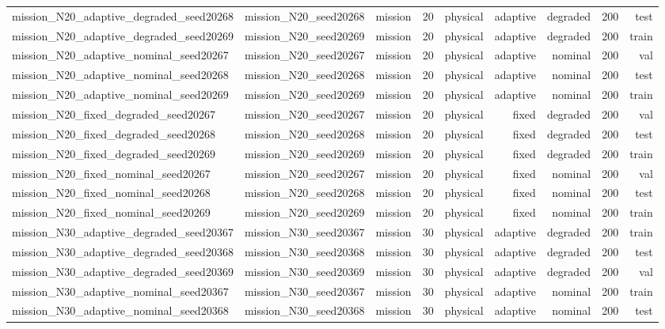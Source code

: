 \begin{tabular}{lrrrrrrrr}
mission\_N20\_adaptive\_degraded\_seed20268 & mission\_N20\_seed20268 & mission & 20 & physical & adaptive & degraded & 200 & test \\
mission\_N20\_adaptive\_degraded\_seed20269 & mission\_N20\_seed20269 & mission & 20 & physical & adaptive & degraded & 200 & train \\
mission\_N20\_adaptive\_nominal\_seed20267 & mission\_N20\_seed20267 & mission & 20 & physical & adaptive & nominal & 200 & val \\
mission\_N20\_adaptive\_nominal\_seed20268 & mission\_N20\_seed20268 & mission & 20 & physical & adaptive & nominal & 200 & test \\
mission\_N20\_adaptive\_nominal\_seed20269 & mission\_N20\_seed20269 & mission & 20 & physical & adaptive & nominal & 200 & train \\
mission\_N20\_fixed\_degraded\_seed20267 & mission\_N20\_seed20267 & mission & 20 & physical & fixed & degraded & 200 & val \\
mission\_N20\_fixed\_degraded\_seed20268 & mission\_N20\_seed20268 & mission & 20 & physical & fixed & degraded & 200 & test \\
mission\_N20\_fixed\_degraded\_seed20269 & mission\_N20\_seed20269 & mission & 20 & physical & fixed & degraded & 200 & train \\
mission\_N20\_fixed\_nominal\_seed20267 & mission\_N20\_seed20267 & mission & 20 & physical & fixed & nominal & 200 & val \\
mission\_N20\_fixed\_nominal\_seed20268 & mission\_N20\_seed20268 & mission & 20 & physical & fixed & nominal & 200 & test \\
mission\_N20\_fixed\_nominal\_seed20269 & mission\_N20\_seed20269 & mission & 20 & physical & fixed & nominal & 200 & train \\
mission\_N30\_adaptive\_degraded\_seed20367 & mission\_N30\_seed20367 & mission & 30 & physical & adaptive & degraded & 200 & train \\
mission\_N30\_adaptive\_degraded\_seed20368 & mission\_N30\_seed20368 & mission & 30 & physical & adaptive & degraded & 200 & test \\
mission\_N30\_adaptive\_degraded\_seed20369 & mission\_N30\_seed20369 & mission & 30 & physical & adaptive & degraded & 200 & val \\
mission\_N30\_adaptive\_nominal\_seed20367 & mission\_N30\_seed20367 & mission & 30 & physical & adaptive & nominal & 200 & train \\
mission\_N30\_adaptive\_nominal\_seed20368 & mission\_N30\_seed20368 & mission & 30 & physical & adaptive & nominal & 200 & test \\

\end{tabular}
